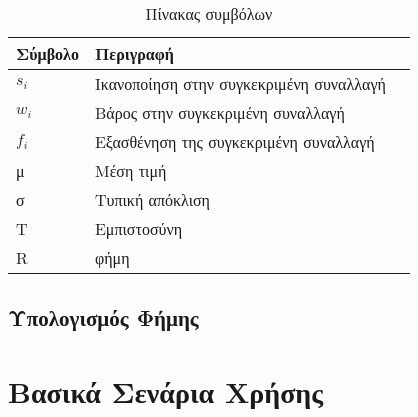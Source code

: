 \begin{table}[H]
    \centering
    \begin{tabular}{ | l | l | l | }
        \hline
        Σύμβολο & Περιγραφή \\ \hline \hline
        $s_i$ & Ικανοποίηση στην συγκεκριμένη συναλλαγή  \\ \hline
        $w_i$ & Βάρος στην συγκεκριμένη συναλλαγή  \\ \hline
        $f_i$ & Εξασθένηση της συγκεκριμένη συναλλαγή  \\ \hline
        μ 	& Μέση τιμή \\ \hline
        σ   & Τυπική απόκλιση \\ \hline
        Τ   & Εμπιστοσύνη \\ \hline
        R   & φήμη \\ \hline
    \end{tabular}
    \caption{Πίνακας συμβόλων}
    \label{tab:symbols}
\end{table}
\newpage
\subsection{Υπολογισμός Φήμης}
\section{Βασικά Σενάρια Χρήσης}


